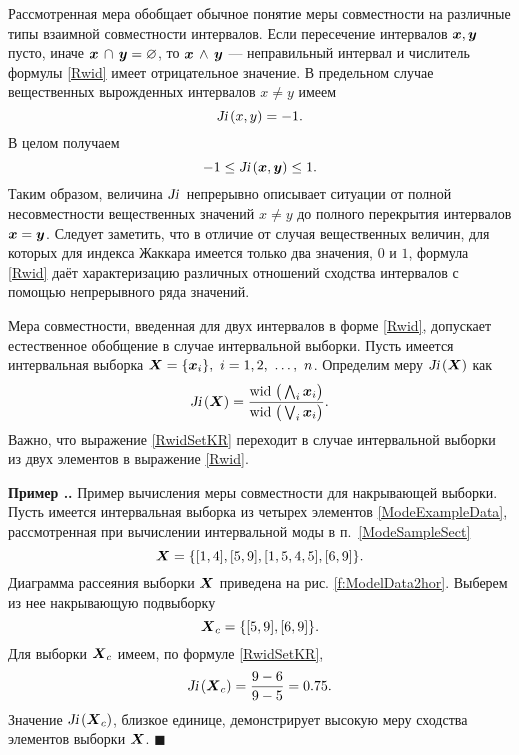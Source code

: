\documentclass[a5paper,openany]{book}
\newcommand{\mbf}[1]{\protect\text{\boldmath$#1$}}
\newcommand{\Ji}{\textsl{Ji}\,}
\newcommand{\w}{\mathrm{wid}\;}
\newcounter{ExmpNum}[section]
\renewcommand{\theExmpNum}{\thesection.\arabic{ExmpNum}}
\newenvironment{example}%
  {\refstepcounter{ExmpNum}%
  \par\addvspace{\medskipamount} 
  \noindent\textbf{Пример {\theExmpNum}.}
  }%
  {\hfill$\blacksquare$\par\medskip}
\begin{document}
Рассмотренная мера обобщает обычное понятие меры совместности на различные типы 
взаимной совместности интервалов. Если пересечение интервалов $\mbf{x}, \mbf{y} $ 
пусто, иначе  $\mbf{x} \, \cap \, \mbf{y} = \varnothing$, то $\mbf{x} \, \wedge \, 
\mbf{y}$ --- неправильный интервал и числитель формулы \eqref{Rwid} имеет отрицательное 
значение. В предельном случае вещественных вырожденных интервалов $x \neq y$ имеем
\begin{equation*}
\Ji(x, y) = -1.
\end{equation*}
В целом получаем
\begin{equation}\label{Rwidrange}
-1 \leq \Ji (\mbf{x}, \mbf{y}) \leq 1.
\end{equation}
Таким образом, величина $\Ji$ непрерывно описывает ситуации от полной несовместности 
вещественных значений $x\neq y$ до полного перекрытия интервалов $\mbf{x} = \mbf{y}$. 
Следует заметить, что в отличие от случая вещественных величин, для которых для индекса 
Жаккара имеется только два значения, $0$ и $1$, формула \eqref{Rwid} даёт характеризацию 
различных отношений сходства интервалов с помощью непрерывного ряда значений. 
  
Мера совместности, введенная  для двух интервалов  в форме \eqref{Rwid}, допускает 
естественное обобщение в случае интервальной выборки. Пусть имеется интервальная 
выборка  $\mbf{X} = \{ \mbf{x}_i \}, \ i=1,2, \ \ldots, \ n$. Определим меру 
$\Ji(\mbf{X})$ как 
\begin{align} 
\label{RwidSetKR}
\Ji (\mbf{X}) = 
\frac{\w\bigl(\,\bigwedge_{i} \mbf{x}_{i}\bigr)}{\w\bigl(\,\bigvee_{i}\mbf{x}_i\bigr)}. 
\end{align}
Важно, что выражение \eqref{RwidSetKR} переходит в случае интервальной выборки 
из двух элементов в выражение \eqref{Rwid}. %
  
\begin{example}{Пример вычисления меры совместности для накрывающей выборки.}
Пусть имеется интервальная выборка из четырех элементов \eqref{ModeExampleData}, 
рассмотренная при вычислении интервальной моды в п.~\ref{ModeSampleSect} 
\begin{equation*}
\mbf{X}   = \{ 
[1, 4],  [5, 9],  [1,5, 4,5],   [6, 9]   \}.
\end{equation*}	
Диаграмма рассеяния выборки $\mbf{X}$ приведена на рис. \ref{f:ModelData2hor}.
Выберем из нее накрывающую подвыборку
\begin{equation*}
\mbf{X}_{c}   = \{  
[5, 9],   [6, 9]  \}.
\end{equation*}	
Для выборки $\mbf{X}_{c}$  имеем, по формуле \eqref{RwidSetKR},
\begin{equation*}
\Ji(\mbf{X}_{c}) = \frac{9-6}{9-5} = 0.75.
\end{equation*}
Значение $\Ji(\mbf{X}_{c})$, близкое единице, демонстрирует высокую меру 
сходства элементов выборки $\mbf{X}$. 
\end{example}
  
\end{document}
